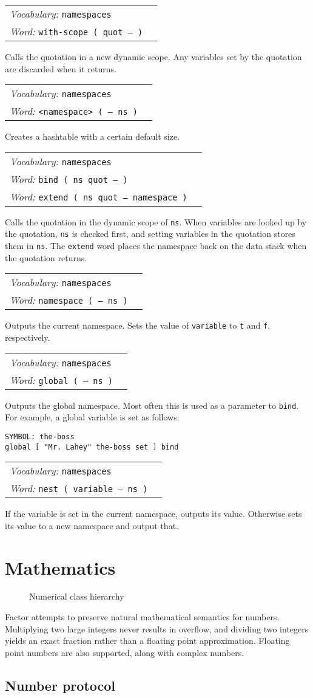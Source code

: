 \documentclass{book}
\newcommand{\vocabulary}[1]{\emph{Vocabulary:} \texttt{#1}&\\}
\newcommand{\ordinaryword}[2]{\index{\texttt{#1}}\emph{Word:} \texttt{#2}&\\}
\newcommand{\wordtable}[1]{

\begin{tabularx}{12cm}[t]{lX}
\hline
#1
\hline
\end{tabularx}

}
\begin{document}
\wordtable{
\vocabulary{namespaces}
\ordinaryword{with-scope}{with-scope ( quot -- )}
}
Calls the quotation in a new dynamic scope. Any variables set by the quotation are discarded when it returns.
\wordtable{
\vocabulary{namespaces}
\ordinaryword{<namespace>}{<namespace> ( -- ns )}
}
Creates a hashtable with a certain default size.
\wordtable{
\vocabulary{namespaces}
\ordinaryword{bind}{bind ( ns quot -- )}
\ordinaryword{extend}{extend ( ns quot -- namespace )}
}
Calls the quotation in the dynamic scope of \texttt{ns}. When variables are looked up by the quotation, \texttt{ns} is checked first, and setting variables in the quotation stores them in \texttt{ns}. The \texttt{extend} word places the namespace back on the data stack when the quotation returns.
\wordtable{
\vocabulary{namespaces}
\ordinaryword{namespace}{namespace ( -- ns )}
}
Outputs the current namespace.
Sets the value of \texttt{variable} to \texttt{t} and \texttt{f}, respectively.
\wordtable{
\vocabulary{namespaces}
\ordinaryword{global}{global ( -- ns )}
}
Outputs the global namespace. Most often this is used as a parameter to \texttt{bind}. For example, a global variable is set as follows:
\begin{verbatim}
SYMBOL: the-boss
global [ "Mr. Lahey" the-boss set ] bind
\end{verbatim}
\wordtable{
\vocabulary{namespaces}
\ordinaryword{nest}{nest ( variable -- ns )}
}
If the variable is set in the current namespace, outputs its value. Otherwise sets its value to a new namespace and output that.

\section{Mathematics}

\numberglos

\begin{figure}
\caption{Numerical class hierarchy}
\begin{center}
\end{center}
\end{figure}

Factor attempts to preserve natural mathematical semantics for numbers. Multiplying two large integers never results in overflow, and dividing two integers yields an exact fraction rather than a floating point approximation. Floating point numbers are also supported, along with complex numbers.

\subsection{Number protocol}
\end{document}
